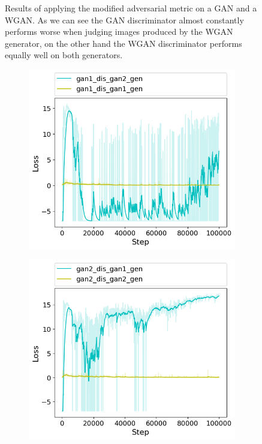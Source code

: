 \begin{figure}[h!]
\begin{subfigure}[b]{0.5\textwidth}
	\end{subfigure}
	\caption{Results of applying the modified adversarial metric on a GAN and a WGAN. As we can see the GAN discriminator almost constantly performs worse when judging images produced by the WGAN generator, on the other hand the WGAN discriminator performs equally well on both generators.}
	\label{fig:cd_wgan_vs_gan}
\end{figure}

\begin{figure}[h!]
	\begin{subfigure}[b]{0.5\textwidth}
		\includegraphics[width=\textwidth]{figures/cross_dis/trial15_gan1_dis_gan2_gen}
	\end{subfigure}
	\begin{subfigure}[b]{0.5\textwidth}
		\includegraphics[width=\textwidth]{figures/cross_dis/trial15_gan2_dis_gan1_gen}

\end{subfigure}
\end{figure}
